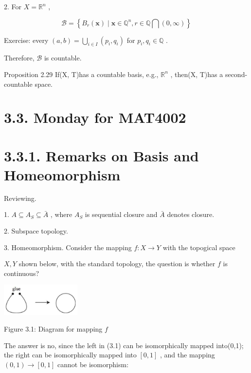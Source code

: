 2. For \(X = {\mathbb{R}}^{n}\) ,

\[
\mathcal{B} = \left\{  {{B}_{r}\left( \mathbf{x}\right)  \mid  \mathbf{x} \in  {\mathbb{Q}}^{n},r \in  \mathbb{Q}\bigcap \left( {0,\infty }\right) }\right\}
\]

Exercise: every \(\left( {a,b}\right)  = \mathop{\bigcup }\limits_{{i \in  I}}\left( {{p}_{i},{q}_{i}}\right)\) for \({p}_{i},{q}_{i} \in  \mathbb{Q}\) .

Therefore, \(\mathcal{B}\) is countable.

Proposition 2.29 If(X, T)has a countable basis, e.g., \({\mathbb{R}}^{n}\) , then(X, T)has a second-countable space.

\section*{3.3. Monday for MAT4002}

\section*{3.3.1. Remarks on Basis and Homeomorphism}

Reviewing.

1. \(A \subseteq  {A}_{S} \subseteq  \bar{A}\) , where \({A}_{S}\) is sequential closure and \(\bar{A}\) denotes closure.

2. Subspace topology.

3. Homeomorphism. Consider the mapping \(f : X \rightarrow  Y\) with the topogical space

\(X,Y\) shown below, with the standard topology, the question is whether \(f\) is continuous?

\begin{center}
\includegraphics[max width=0.3\textwidth]{images/bo_d2bcsrref24c73avs720_36_777_903_410_168_0.jpg}
\end{center}
\hspace*{3em} 

Figure 3.1: Diagram for mapping \(f\)

The answer is no, since the left in (3.1) can be isomorphically mapped into(0,1); the right can be isomorphically mapped into \(\left\lbrack  {0,1}\right\rbrack\) , and the mapping \(\left( {0,1}\right)  \rightarrow  \left\lbrack  {0,1}\right\rbrack\) cannot be isomorphism:

